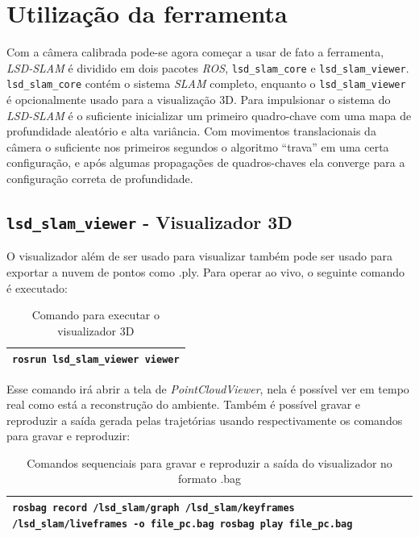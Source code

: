 \section{Utilização da ferramenta}

Com a câmera calibrada pode-se agora começar a usar de fato a ferramenta, \textit{LSD-SLAM} é dividido em dois pacotes \textit{ROS}, \texttt{lsd\_slam\_core} e \texttt{lsd\_slam\_viewer}. \texttt{lsd\_slam\_core} contém o sistema \textit{SLAM} completo, enquanto o \texttt{lsd\_slam\_viewer} é opcionalmente usado para a visualização 3D.
Para impulsionar o sistema do \textit{LSD-SLAM} é o suficiente inicializar um primeiro quadro-chave com uma mapa de profundidade aleatório e alta variância. Com movimentos translacionais da câmera o suficiente nos primeiros segundos o algoritmo “trava” em uma certa configuração, e após algumas propagações de quadros-chaves ela converge para a configuração correta de profundidade.

\subsection{\texttt{lsd\_slam\_viewer} - Visualizador 3D}

O visualizador além de ser usado para visualizar também pode ser usado para exportar a nuvem de pontos como .ply. Para operar ao vivo, o seguinte comando é executado:

\begin{table}[!ht]\label{tb:12}
\begin{tabular}{| p{\textwidth}|}
\hline
\texttt{rosrun lsd\_slam\_viewer viewer}\\
\hline
\end{tabular}
\caption{Comando para executar o visualizador 3D}
\end{table}

Esse comando irá abrir a tela de \textit{PointCloudViewer}, nela é possível ver em tempo real como está a reconstrução do ambiente. Também é possível gravar e reproduzir a saída gerada pelas trajetórias usando respectivamente os comandos para gravar e reproduzir:

\begin{table}[!ht]\label{tb:13}
\begin{tabular}{| p{\textwidth}|}
\hline
\texttt{rosbag record /lsd\_slam/graph /lsd\_slam/keyframes /lsd\_slam/liveframes -o file\_pc.bag
rosbag play file\_pc.bag}\\
\hline
\end{tabular}
\caption{Comandos sequenciais para gravar e reproduzir a saída do visualizador no formato .bag}
\end{table}

